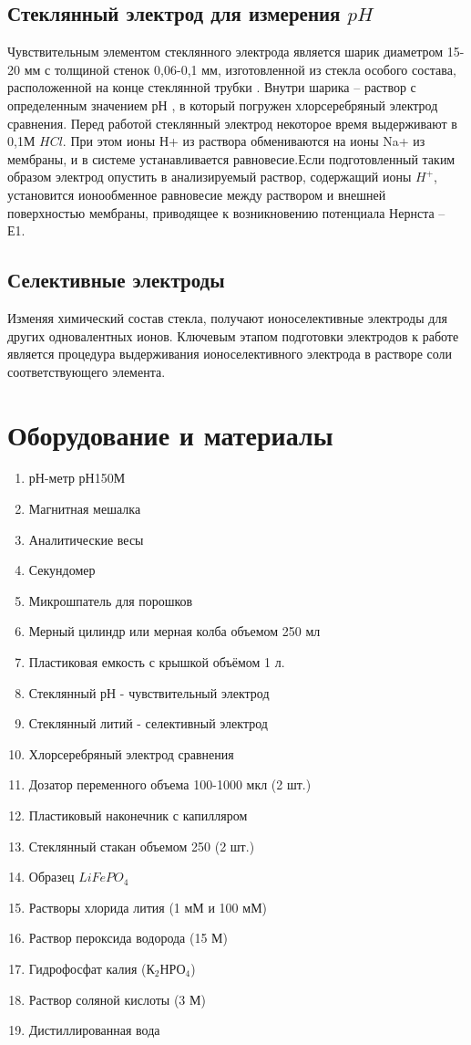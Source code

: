 \documentclass[a4paper,12pt]{article} %
\begin{document}
\subsection{Стеклянный электрод для измерения $pH$}
Чувствительным элементом стеклянного электрода является шарик диаметром 15-20 мм с толщиной стенок 0,06-0,1 мм, изготовленной из стекла особого состава, расположенной на конце стеклянной трубки . Внутри шарика – раствор с определенным значением рН , в который погружен хлорсеребряный электрод сравнения. Перед работой стеклянный электрод некоторое время выдерживают в 0,1М $HCl$. При этом ионы Н+ из раствора обмениваются на ионы Na+ из мембраны, и в системе устанавливается равновесие.Если подготовленный таким образом электрод опустить в анализируемый раствор, содержащий ионы $H^+$, установится ионообменное равновесие между раствором и внешней поверхностью мембраны, приводящее к возникновению потенциала Нернста –  Е1.
\subsection{Селективные электроды}\par 
Изменяя химический состав стекла, получают ионоселективные электроды для других одновалентных ионов. Ключевым этапом подготовки электродов к работе является процедура выдерживания ионоселективного электрода в растворе соли соответствующего элемента. 
\section{Оборудование и материалы}
\begin{enumerate}
     И-160М
\item $рН$-метр $рН$150М
\item Магнитная мешалка
\item Аналитические весы
\item Секундомер
\item Микрошпатель для порошков
\item Мерный цилиндр или мерная колба объемом 250 мл
\item Пластиковая емкость с крышкой объёмом 1 л.
\item Стеклянный $рН$ - чувствительный электрод
\item 	Стеклянный литий - селективный электрод
\item Хлорсеребряный электрод сравнения
\item Дозатор переменного объема 100-1000 мкл (2 шт.)
\item Пластиковый наконечник с капилляром
\item Стеклянный стакан объемом 250 (2 шт.)
\item Образец $LiFePO_4$
\item Растворы хлорида лития (1 мМ и 100 мМ)
\item Раствор пероксида водорода (15 М)
\item Гидрофосфат калия ($К_2НРО_4$)
\item Раствор соляной кислоты (3 М)
\item Дистиллированная вода

\end{enumerate}
\end{document}
